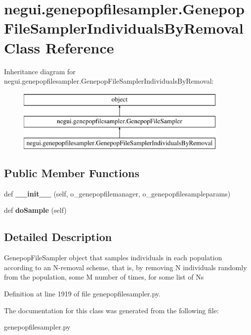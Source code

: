 \hypertarget{classnegui_1_1genepopfilesampler_1_1GenepopFileSamplerIndividualsByRemoval}{}\section{negui.\+genepopfilesampler.\+Genepop\+File\+Sampler\+Individuals\+By\+Removal Class Reference}
\label{classnegui_1_1genepopfilesampler_1_1GenepopFileSamplerIndividualsByRemoval}
Inheritance diagram for negui.\+genepopfilesampler.\+Genepop\+File\+Sampler\+Individuals\+By\+Removal\+:\begin{figure}[H]
\begin{center}
\leavevmode
\includegraphics[height=3.000000cm]{classnegui_1_1genepopfilesampler_1_1GenepopFileSamplerIndividualsByRemoval}
\end{center}
\end{figure}
\subsection*{Public Member Functions}
\begin{DoxyCompactItemize}
\item 
def {\bfseries \+\_\+\+\_\+init\+\_\+\+\_\+} (self, o\+\_\+genepopfilemanager, o\+\_\+genepopfilesampleparams)\hypertarget{classnegui_1_1genepopfilesampler_1_1GenepopFileSamplerIndividualsByRemoval_aeba1258d811dd266cb3378212a4a1926}{}\label{classnegui_1_1genepopfilesampler_1_1GenepopFileSamplerIndividualsByRemoval_aeba1258d811dd266cb3378212a4a1926}

\item 
def {\bfseries do\+Sample} (self)\hypertarget{classnegui_1_1genepopfilesampler_1_1GenepopFileSamplerIndividualsByRemoval_a89dd3d276b9f089ac4c46dd844e7a848}{}\label{classnegui_1_1genepopfilesampler_1_1GenepopFileSamplerIndividualsByRemoval_a89dd3d276b9f089ac4c46dd844e7a848}

\end{DoxyCompactItemize}


\subsection{Detailed Description}
\begin{DoxyVerb}GenepopFileSampler object that samples individuals in each population
according to an N-removal scheme, that is, by removing N individuals 
randomly from the population, some M number of times, for some list of Ns
\end{DoxyVerb}
 

Definition at line 1919 of file genepopfilesampler.\+py.



The documentation for this class was generated from the following file\+:\begin{DoxyCompactItemize}
\item 
genepopfilesampler.\+py\end{DoxyCompactItemize}
